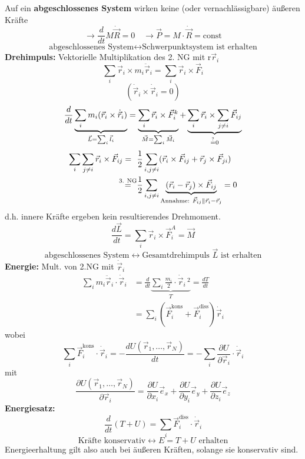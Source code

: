 \documentclass[titlepage,12pt,a4paper,ngerman]{report}
\newcommand{\tx}[1]{\textrm{#1}}
\begin{document}
Auf ein \textbf{abgeschlossenes System} wirken keine (oder vernachlässigbare) äußeren Kräfte\\
$$\rightarrow \frac{d}{dt} M \dot{\vec{R}} = 0 \quad \rightarrow \vec{P} = M \cdot \dot{\vec{R}} = \textrm{const}$$
$$\textrm{abgeschlossenes System} \leftrightarrow \textrm{Schwerpunktsystem ist erhalten}$$
\textbf{Drehimpuls:} 
Vektorielle Multiplikation des 2. NG mit r$\vec{r}_i$ 
$$ \sum_{i} \vec{r}_i \times m_i\ddot{\vec{r}}_i = \sum_{i} \vec{r}_i \times \vec{F}_i$$
$$( \dot{\vec{r}}_i \times \dot{\vec{r}}_i = 0)$$
$$\frac{d}{dt} \underbrace{\sum_i m_i (\vec{r}_i \times \dot{\vec{r}}_i)} _{\vec{L} = \sum_i \vec{l}_i} = \underbrace{\sum_i \vec{r}_i \times \vec{F}_i^k}_{\vec{M} = \sum_i \vec{M}_i} + \underbrace{\sum_i \vec{r}_i \times \sum _{j\neq i} \vec{F}_{ij}}_{\buildrel ? \over = 0}$$
\begin{align*}
\sum_i \sum_{j\neq i} \vec{r}_i \times \vec{F}_{ij} = \ \  &\frac{1}{2} \sum_{i, j\neq i} (\vec{r}_i \times \vec{F}_{ij} + \vec{r}_j\times \vec{F}_{ji}) \\
\buildrel \textrm{3. NG} \over = &\frac{1}{2} \sum_{i,j\neq i} \underbrace{(\vec{r}_i - \vec{r}_j) \times \vec{F}_{ij}}_{\textrm{Annahme: } \vec{F}_{ij} \parallel \vec{r}_i - \vec{r}_j} = 0
\end{align*}
d.h. innere Kräfte ergeben kein resultierendes Drehmoment.
$$\frac{d\vec{L}}{dt} = \sum_i \vec{r}_i \times \vec{F}_i^A = \vec{M}  $$
$$\textrm{abgeschlossenes System} \leftrightarrow \textrm{Gesamtdrehimpuls } \vec{L} \textrm{ ist erhalten}$$
\textbf{Energie:}
Mult. von 2.NG mit $\dot{\vec{r}}_i$ 
\begin{align*}
\sum_i m_i \ddot{\vec{r}}_i \cdot \dot{\vec{r}}_i &= \frac{d}{dt} \underbrace{\sum_i \frac{m_i}{2} \cdot \dot{\vec{r}}_i\,^2}_{T} = \frac{dT}{dt} \\
&= \sum_i (\vec{F}_{i}^{\tx{kons}} + \vec{F}_{i}^{\tx{diss}}) \dot{\vec{r}}_i
\end{align*}
wobei
$$ \sum_i \vec{F}_i^{\tx{kons}} \cdot \dot{\vec{r}}_i = -\frac{dU(\vec{r}_1,\dots , \vec{r}_N)}{dt} = - \sum_i \frac{\partial U}{\partial \vec{r}_i} \cdot \dot{\vec{r}}_i$$
mit
$$\frac{\partial U (\vec{r}_1, \dots , \vec{r}_N)}{\partial \vec{r}_i} = \frac{\partial U}{\partial x_i} \vec{e}_x + \frac{\partial U}{\partial y_i } \vec{e}_y + \frac{\partial U}{\partial z_i } \vec{e}_z$$
\textbf{Energiesatz:}
$$ \frac{d}{dt} (T+U) = \sum_i \vec{F}^{\tx{diss}}_i \cdot \dot{\vec{r}}_i$$
$$\textrm{Kräfte konservativ} \leftrightarrow E =  T + U \textrm{ erhalten}$$
Energieerhaltung gilt also auch bei äußeren Kräften, solange sie konservativ sind.\\[5pt]
\end{document}
